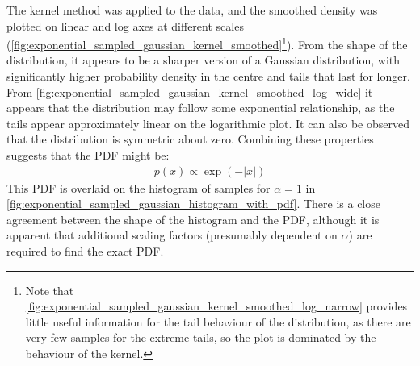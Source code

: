 \documentclass[a4paper]{article}
\begin{document}
The kernel method was applied to the data, and the smoothed density was plotted on linear and log axes at different
scales (\autoref{fig:exponential_sampled_gaussian_kernel_smoothed}\footnote{Note that
\autoref{fig:exponential_sampled_gaussian_kernel_smoothed_log_narrow} provides little useful information for the tail behaviour of
the distribution, as there are very few samples for the extreme tails, so the plot is dominated by the
behaviour of the kernel.}).
From the shape of the distribution, it appears to be a sharper version of a Gaussian distribution, with significantly
higher probability density in the centre and tails that last for longer.
From \autoref{fig:exponential_sampled_gaussian_kernel_smoothed_log_wide} it appears that the distribution may follow some
exponential relationship, as the tails appear approximately linear on the logarithmic plot.
It can also be observed that the distribution is symmetric about zero.
Combining these properties suggests that the PDF might be:
\begin{align}\label{eq:estimate_for_p(x)}
    p(x) \propto \exp(-|x|)
\end{align}
This PDF is overlaid on the histogram of samples for $\alpha = 1$ in
\autoref{fig:exponential_sampled_gaussian_histogram_with_pdf}. There is a close agreement between the shape of the
histogram and the PDF, although it is apparent that additional scaling factors (presumably dependent on $\alpha$) are
required to find the exact PDF.
\end{document}
